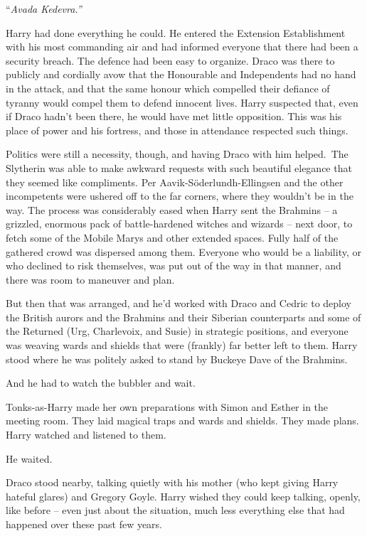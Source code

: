 ``\emph{Avada Kedevra.''}

\mybreak

Harry had done everything he could. He entered the Extension
Establishment with his most commanding air and had informed everyone
that there had been a security breach. The defence had been easy to
organize. Draco was there to publicly and cordially avow that the
Honourable and Independents had no hand in the attack, and that the same
honour which compelled their defiance of tyranny would compel them to
defend innocent lives. Harry suspected that, even if Draco hadn't been
there, he would have met little opposition. This was his place of power
and his fortress, and those in attendance respected such things.

Politics were still a necessity, though, and having Draco with him
helped.~The Slytherin was able to make awkward requests with such
beautiful elegance that they seemed like compliments. Per
Aavik-Söderlundh-Ellingsen and the other incompetents were ushered off
to the far corners, where they wouldn't be in the way. The process was
considerably eased when Harry sent the Brahmins -- a grizzled, enormous
pack of battle-hardened witches and wizards -- next door, to fetch some
of the Mobile Marys and other extended spaces. Fully half of the
gathered crowd was dispersed among them. Everyone who would be a
liability, or who declined to risk themselves, was put out of the way in
that manner, and there was room to maneuver and plan.

But then that was arranged, and he'd worked with Draco and Cedric to
deploy the British aurors and the Brahmins and their Siberian
counterparts and some of the Returned (Urg, Charlevoix, and Susie) in
strategic positions, and everyone was weaving wards and shields that
were (frankly) far better left to them. Harry stood where he was
politely asked to stand by Buckeye Dave of the Brahmins.

And he had to watch the bubbler and wait.

Tonks-as-Harry made her own preparations with Simon and Esther in the
meeting room. They laid magical traps and wards and shields. They made
plans. Harry watched and listened to them.

He waited.

Draco stood nearby, talking quietly with his mother (who kept giving
Harry hateful glares) and Gregory Goyle. Harry wished they could keep
talking, openly, like before -- even just about the situation, much less
everything else that had happened over these past few years.

